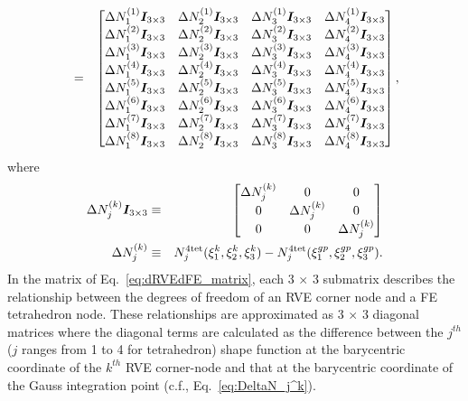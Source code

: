 \begin{eqnarray}
%
&=&\begin{bmatrix}
\Delta N_1^{(1)} \mat{I}_{3\times3} & \Delta N_2^{(1)}\mat{I}_{3\times3} & \Delta N_3^{(1)} \mat{I}_{3\times3} & \Delta N_4^{(1)}\mat{I}_{3\times3} \\
%
\Delta N_1^{(2)} \mat{I}_{3\times3} & \Delta N_2^{(2)}\mat{I}_{3\times3} & \Delta N_3^{(2)} \mat{I}_{3\times3} & \Delta N_4^{(2)}\mat{I}_{3\times3} \\
%
\Delta N_1^{(3)} \mat{I}_{3\times3} & \Delta N_2^{(3)}\mat{I}_{3\times3} & \Delta N_3^{(3)} \mat{I}_{3\times3} & \Delta N_4^{(3)}\mat{I}_{3\times3} \\
%
\Delta N_1^{(4)} \mat{I}_{3\times3} & \Delta N_2^{(4)}\mat{I}_{3\times3} & \Delta N_3^{(4)} \mat{I}_{3\times3} & \Delta N_4^{(4)}\mat{I}_{3\times3} \\
%
\Delta N_1^{(5)} \mat{I}_{3\times3} & \Delta N_2^{(5)}\mat{I}_{3\times3} & \Delta N_3^{(5)} \mat{I}_{3\times3} & \Delta N_4^{(5)}\mat{I}_{3\times3} \\
%
\Delta N_1^{(6)} \mat{I}_{3\times3} & \Delta N_2^{(6)}\mat{I}_{3\times3} & \Delta N_3^{(6)} \mat{I}_{3\times3} & \Delta N_4^{(6)}\mat{I}_{3\times3} \\
%
\Delta N_1^{(7)} \mat{I}_{3\times3} & \Delta N_2^{(7)}\mat{I}_{3\times3} & \Delta N_3^{(7)} \mat{I}_{3\times3} & \Delta N_4^{(7)}\mat{I}_{3\times3} \\
%
\Delta N_1^{(8)} \mat{I}_{3\times3} & \Delta N_2^{(8)}\mat{I}_{3\times3} & \Delta N_3^{(8)} \mat{I}_{3\times3} & \Delta N_4^{(8)}\mat{I}_{3\times3} 
\end{bmatrix},
\label{eq:dRVEdFE_matrix}
\end{eqnarray}
%
where
%
\begin{eqnarray}
\Delta N_j^{(k)} \mat{I}_{3\times3} &\equiv&
\begin{bmatrix}
\Delta N_j^{(k)} & 0 & 0 \\
0 & \Delta N_j^{(k)} & 0 \\
0 & 0 & \Delta N_j^{(k)} 
\end{bmatrix} \nonumber\\
%
\Delta N_j^{(k)} &\equiv& N_j^{4\text{tet}}(\xi_1^k,\xi_2^k,\xi_3^k) - N_j^{4\text{tet}}(\xi_1^{gp},\xi_2^{gp},\xi_3^{gp}) .
\label{eq:DeltaN_j^k}
\end{eqnarray}
%
In the matrix of Eq.\ \eqref{eq:dRVEdFE_matrix}, each 3 $\times$ 3 submatrix describes the relationship between the degrees of freedom of an RVE corner node and a FE tetrahedron node. These relationships are approximated as 3 $\times$ 3 diagonal matrices where the diagonal terms are calculated as the difference between the $j^{th}$ ($j$ ranges from 1 to 4 for tetrahedron) shape function at the barycentric coordinate of the $k^{th}$ RVE corner-node and that at the barycentric coordinate of the Gauss integration point (c.f., Eq.\ \eqref{eq:DeltaN_j^k}). 